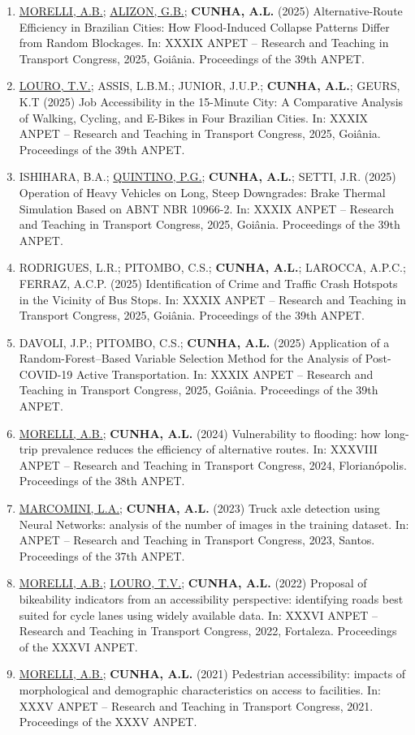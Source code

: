 \documentclass[
  10pt,
  a4paper,
  DIV=11,
  numbers=noendperiod]{scrartcl}
\begin{document}
\begin{enumerate}
\def\labelenumi{\arabic{enumi}.}
\item
  \ul{MORELLI, A.B.}; \ul{ALIZON, G.B.}; \textbf{CUNHA, A.L.} (2025)
  Alternative-Route Efficiency in Brazilian Cities: How Flood-Induced
  Collapse Patterns Differ from Random Blockages. In: XXXIX ANPET --
  Research and Teaching in Transport Congress, 2025, Goiânia.
  Proceedings of the 39th ANPET.
\item
  \ul{LOURO, T.V.}; ASSIS, L.B.M.; JUNIOR, J.U.P.; \textbf{CUNHA, A.L.};
  GEURS, K.T (2025) Job Accessibility in the 15-Minute City: A
  Comparative Analysis of Walking, Cycling, and E-Bikes in Four
  Brazilian Cities. In: XXXIX ANPET -- Research and Teaching in
  Transport Congress, 2025, Goiânia. Proceedings of the 39th ANPET.
\item
  ISHIHARA, B.A.; \ul{QUINTINO, P.G.}; \textbf{CUNHA, A.L.}; SETTI, J.R.
  (2025) Operation of Heavy Vehicles on Long, Steep Downgrades: Brake
  Thermal Simulation Based on ABNT NBR 10966-2. In: XXXIX ANPET --
  Research and Teaching in Transport Congress, 2025, Goiânia.
  Proceedings of the 39th ANPET.
\item
  RODRIGUES, L.R.; PITOMBO, C.S.; \textbf{CUNHA, A.L.}; LAROCCA, A.P.C.;
  FERRAZ, A.C.P. (2025) Identification of Crime and Traffic Crash
  Hotspots in the Vicinity of Bus Stops. In: XXXIX ANPET -- Research and
  Teaching in Transport Congress, 2025, Goiânia. Proceedings of the 39th
  ANPET.
\item
  DAVOLI, J.P.; PITOMBO, C.S.; \textbf{CUNHA, A.L.} (2025) Application
  of a Random-Forest--Based Variable Selection Method for the Analysis
  of Post-COVID-19 Active Transportation. In: XXXIX ANPET -- Research
  and Teaching in Transport Congress, 2025, Goiânia. Proceedings of the
  39th ANPET.
\item
  \ul{MORELLI, A.B.}; \textbf{CUNHA, A.L.} (2024) Vulnerability to
  flooding: how long-trip prevalence reduces the efficiency of
  alternative routes. In: XXXVIII ANPET -- Research and Teaching in
  Transport Congress, 2024, Florianópolis. Proceedings of the 38th
  ANPET.
\item
  \ul{MARCOMINI, L.A.}; \textbf{CUNHA, A.L.} (2023) Truck axle detection
  using Neural Networks: analysis of the number of images in the
  training dataset. In: ANPET -- Research and Teaching in Transport
  Congress, 2023, Santos. Proceedings of the 37th ANPET.
\item
  \ul{MORELLI, A.B.}; \ul{LOURO, T.V.}; \textbf{CUNHA, A.L.} (2022)
  Proposal of bikeability indicators from an accessibility perspective:
  identifying roads best suited for cycle lanes using widely available
  data. In: XXXVI ANPET -- Research and Teaching in Transport Congress,
  2022, Fortaleza. Proceedings of the XXXVI ANPET.
\item
  \ul{MORELLI, A.B.}; \textbf{CUNHA, A.L.} (2021) Pedestrian
  accessibility: impacts of morphological and demographic
  characteristics on access to facilities. In: XXXV ANPET -- Research
  and Teaching in Transport Congress, 2021. Proceedings of the XXXV
  ANPET.
\end{enumerate}
\end{document}
